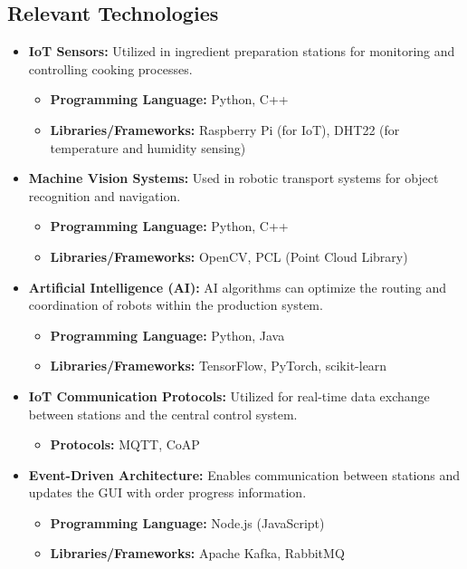 \documentclass[conference]{IEEEtran}
\begin{document}
\subsection{Relevant Technologies}

\begin{itemize}
    \item \textbf{IoT Sensors:} Utilized in ingredient preparation stations for monitoring and controlling cooking processes.
    \begin{itemize}
        \item \textbf{Programming Language:} Python, C++
        \item \textbf{Libraries/Frameworks:} Raspberry Pi (for IoT), DHT22 (for temperature and humidity sensing)
    \end{itemize}
    
    \item \textbf{Machine Vision Systems:} Used in robotic transport systems for object recognition and navigation.
    \begin{itemize}
        \item \textbf{Programming Language:} Python, C++
        \item \textbf{Libraries/Frameworks:} OpenCV, PCL (Point Cloud Library)
    \end{itemize}
    
    \item \textbf{Artificial Intelligence (AI):} AI algorithms can optimize the routing and coordination of robots within the production system.
    \begin{itemize}
        \item \textbf{Programming Language:} Python, Java
        \item \textbf{Libraries/Frameworks:} TensorFlow, PyTorch, scikit-learn
    \end{itemize}
    
    \item \textbf{IoT Communication Protocols:} Utilized for real-time data exchange between stations and the central control system.
    \begin{itemize}
        \item \textbf{Protocols:} MQTT, CoAP
    \end{itemize}
    
    \item \textbf{Event-Driven Architecture:} Enables communication between stations and updates the GUI with order progress information.
    \begin{itemize}
        \item \textbf{Programming Language:} Node.js (JavaScript)
        \item \textbf{Libraries/Frameworks:} Apache Kafka, RabbitMQ
    \end{itemize}
    

\end{itemize}
\end{document}
